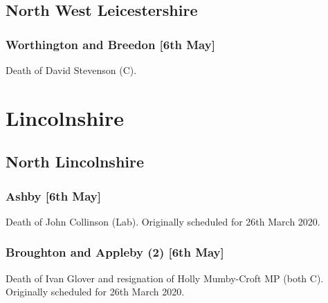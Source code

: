 \documentclass[a4paper,openany]{book}
\begin{document}
\begin{resultsiii}
\subsection*{North West Leicestershire}

\subsubsection*{Worthington and Breedon \hspace*{\fill}\nolinebreak[1]%
	\enspace\hspace*{\fill}
	[6th May]}


Death of David Stevenson (C).

\section{Lincolnshire}

\subsection*{North Lincolnshire}

\subsubsection*{Ashby \hspace*{\fill}\nolinebreak[1]%
	\enspace\hspace*{\fill}
	[6th May]}


Death of John Collinson (Lab).  Originally scheduled for 26th March 2020.

\subsubsection*{Broughton and Appleby (2) \hspace*{\fill}\nolinebreak[1]%
	\enspace\hspace*{\fill}
	[6th May]}


Death of Ivan Glover and resignation of Holly Mumby-Croft MP (both C).  Originally scheduled for 26th March 2020.


\end{resultsiii}
\end{document}
